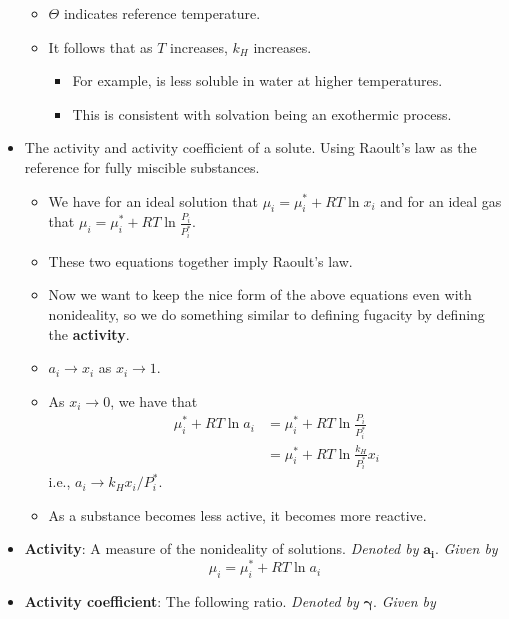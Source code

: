 \documentclass[../notes.tex]{subfiles}
\begin{document}
\begin{itemize}
\begin{equation*}
    \end{equation*}
    \begin{itemize}
        \item $\Theta$ indicates reference temperature.
        \item It follows that as $T$ increases, $k_H$ increases.
        \begin{itemize}
            \item For example,  is less soluble in water at higher temperatures.
            \item This is consistent with solvation being an exothermic process.
        \end{itemize}
    \end{itemize}
    \item The activity and activity coefficient of a solute. Using Raoult's law as the reference for fully miscible substances.
    \begin{itemize}
        \item We have for an ideal solution that $\mu_i=\mu_i^*+RT\ln x_i$ and for an ideal gas that $\mu_i=\mu_i^*+RT\ln\frac{P_i}{P_i^*}$.
        \item These two equations together imply Raoult's law.
        \item Now we want to keep the nice form of the above equations even with nonideality, so we do something similar to defining fugacity by defining the \textbf{activity}.
        \item $a_i\to x_i$ as $x_i\to 1$.
        \item As $x_i\to 0$, we have that
        \begin{align*}
            \mu_i^*+RT\ln a_i &= \mu_i^*+RT\ln\frac{P_i}{P_i^*}\\
            &= \mu_i^*+RT\ln\frac{k_H}{P_i^*}x_i
        \end{align*}
        i.e., $a_i\to k_Hx_i/P_i^*$.
        \item As a substance becomes less active, it becomes more reactive.
    \end{itemize}
    \item \textbf{Activity}: A measure of the nonideality of solutions. \emph{Denoted by} $\bm{a_i}$. \emph{Given by}
    \begin{equation*}
        \mu_i = \mu_i^*+RT\ln a_i
    \end{equation*}
    \item \textbf{Activity coefficient}: The following ratio. \emph{Denoted by} $\bm{\gamma}$. \emph{Given by}

\end{itemize}
\end{document}
